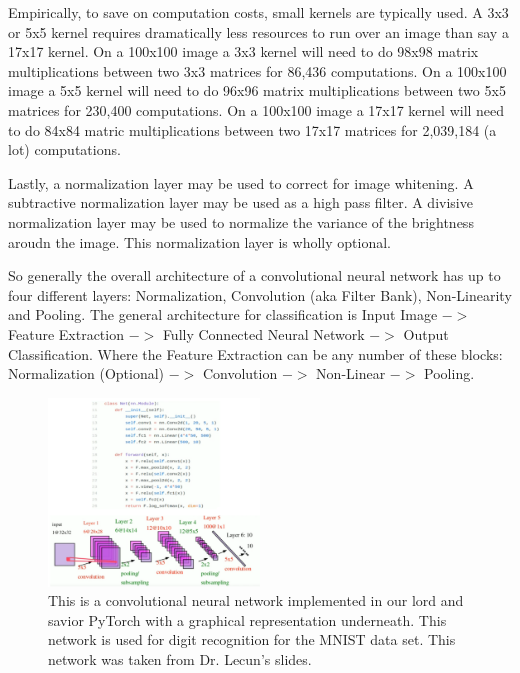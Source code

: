 Empirically, to save on computation costs, small kernels are typically used.
A 3x3 or 5x5 kernel requires dramatically less resources to run over an image than say a 17x17 kernel.
On a 100x100 image a 3x3 kernel will need to do 98x98 matrix multiplications between two 3x3 matrices for 86,436 computations.
On a 100x100 image a 5x5 kernel will need to do 96x96 matrix multiplications between two 5x5 matrices for 230,400 computations.
On a 100x100 image a 17x17 kernel will need to do 84x84 matric multiplications between two 17x17 matrices for 2,039,184 (a lot) computations.

Lastly, a normalization layer may be used to correct for image whitening.
A subtractive normalization layer may be used as a high pass filter.
A divisive normalization layer may be used to normalize the variance of the brightness aroudn the image.
This normalization layer is wholly optional.

So generally the overall architecture of a convolutional neural network has up to four different layers: Normalization, Convolution (aka Filter Bank), Non-Linearity and Pooling.
The general architecture for classification is Input Image $->$ Feature Extraction $->$ Fully Connected Neural Network $->$ Output Classification. 
Where the Feature Extraction can be any number of these blocks: Normalization (Optional) $->$ Convolution $->$ Non-Linear $->$ Pooling.

\begin{figure}[ht]
  \centering
      \includegraphics[width=0.5\textwidth]{lectures/03-b/images/PyTorchCNN.png}
          \caption{
            This is a convolutional neural network implemented in our lord and savior PyTorch with a graphical representation underneath.
            This network is used for digit recognition for the MNIST data set.
            This network was taken from Dr. Lecun's slides.
          }
\end{figure}

